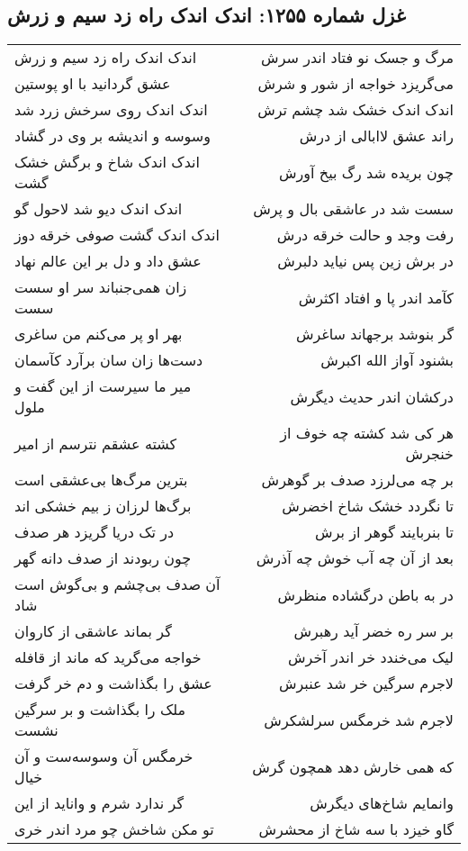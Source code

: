 \begin{center}
\section*{غزل شماره ۱۲۵۵: اندک اندک راه زد سیم و زرش}
\label{sec:1255}
\begin{longtable}{l p{0.5cm} r}
اندک اندک راه زد سیم و زرش
&&
مرگ و جسک نو فتاد اندر سرش
\\
عشق گردانید با او پوستین
&&
می‌گریزد خواجه از شور و شرش
\\
اندک اندک روی سرخش زرد شد
&&
اندک اندک خشک شد چشم ترش
\\
وسوسه و اندیشه بر وی در گشاد
&&
راند عشق لاابالی از درش
\\
اندک اندک شاخ و برگش خشک گشت
&&
چون بریده شد رگ بیخ آورش
\\
اندک اندک دیو شد لاحول گو
&&
سست شد در عاشقی بال و پرش
\\
اندک اندک گشت صوفی خرقه دوز
&&
رفت وجد و حالت خرقه درش
\\
عشق داد و دل بر این عالم نهاد
&&
در برش زین پس نیاید دلبرش
\\
زان همی‌جنباند سر او سست سست
&&
کآمد اندر پا و افتاد اکثرش
\\
بهر او پر می‌کنم من ساغری
&&
گر بنوشد برجهاند ساغرش
\\
دست‌ها زان سان برآرد کآسمان
&&
بشنود آواز الله اکبرش
\\
میر ما سیرست از این گفت و ملول
&&
درکشان اندر حدیث دیگرش
\\
کشته عشقم نترسم از امیر
&&
هر کی شد کشته چه خوف از خنجرش
\\
بترین مرگ‌ها بی‌عشقی است
&&
بر چه می‌لرزد صدف بر گوهرش
\\
برگ‌ها لرزان ز بیم خشکی اند
&&
تا نگردد خشک شاخ اخضرش
\\
در تک دریا گریزد هر صدف
&&
تا بنربایند گوهر از برش
\\
چون ربودند از صدف دانه گهر
&&
بعد از آن چه آب خوش چه آذرش
\\
آن صدف بی‌چشم و بی‌گوش است شاد
&&
در به باطن درگشاده منظرش
\\
گر بماند عاشقی از کاروان
&&
بر سر ره خضر آید رهبرش
\\
خواجه می‌گرید که ماند از قافله
&&
لیک می‌خندد خر اندر آخرش
\\
عشق را بگذاشت و دم خر گرفت
&&
لاجرم سرگین خر شد عنبرش
\\
ملک را بگذاشت و بر سرگین نشست
&&
لاجرم شد خرمگس سرلشکرش
\\
خرمگس آن وسوسه‌ست و آن خیال
&&
که همی خارش دهد همچون گرش
\\
گر ندارد شرم و واناید از این
&&
وانمایم شاخ‌های دیگرش
\\
تو مکن شاخش چو مرد اندر خری
&&
گاو خیزد با سه شاخ از محشرش
\\
\end{longtable}
\end{center}
